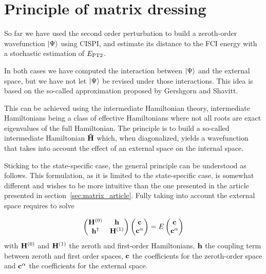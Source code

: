 \documentclass[./thesis.tex]{subfiles}
\begin{document}
\section{Principle of matrix dressing}

So far we have used the second order perturbation to build a zeroth-order wavefunction $\ket \Psi$ using CISPI, and estimate its distance to the FCI energy with a stochastic estimation of $E_\text{PT2}$.

In both cases we have computed the interaction between $\ket \Psi$ and the external space, but we have not let $\ket \Psi$ be revised under those interactions. This idea is based on the so-called \Bk approximation proposed by Gershgorn and Shavitt.\cite{Gershgorn_1968}

This can be achieved using the intermediate Hamiltonian theory,\cite{0305-4470-18-5-014} intermediate Hamiltonians being a class of effective Hamiltonians\cite{lindgren1982atomic} where not all roots are exact eigenvalues of the full Hamiltonian.
The principle is to build a so-called intermediate Hamiltonian ${\bf \tilde H}$ which, when diagonalized, yields a wavefunction that takes into account the effect of an external space on the internal space. 


Sticking to the state-specific case, the general principle can be understood as follows. This formulation, as it is limited to the state-specific case, is somewhat different and wishes to be more intuitive than the one presented in the article presented in section~\ref{sec:matrix_article}.
Fully taking into account the external space requires to solve 

\newcommand{\Hzero}{{H}^{(0)}}
\newcommand{\hcplbold}{{\bf h}}
\newcommand{\Hzerobold}{{\bf H}^{(0)}}
\newcommand{\hcpl}{{h}}

\begin{equation}
\begin{pmatrix}
\Hzerobold &  \hcplbold\\ 
\hcplbold^\dagger & {\bf H}^{(1)}
\end{pmatrix} \begin{pmatrix}
{\bf c}\\ 
{\bf c}^\alpha
\end{pmatrix}=E\begin{pmatrix}
{\bf c}\\ 
{\bf c}^\alpha
\end{pmatrix}
\end{equation}
with ${\bf H}^{(0)}$ and ${\bf H}^{(1)}$ the zeroth and first-order Hamiltonians, $\bf h$ the coupling term between zeroth and first order spaces, ${\bf c}$ the coefficients for the zeroth-order space and ${\bf c}^\alpha$ the coefficients for the external space.
\end{document}
